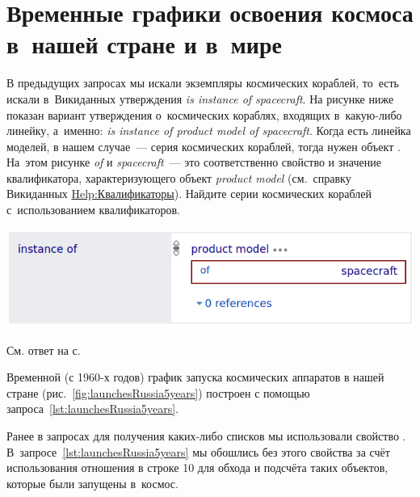 \section{Временные графики освоения космоса в~нашей стране и в~мире}


\begin{marginfigure}[0\baselineskip]
    \MarginQuestion 
    В предыдущих запросах мы искали экземпляры космических кораблей, 
    то~есть искали в~Викиданных утверждения \emph{is instance of spacecraft}. 
    На рисунке ниже показан вариант утверждения 
    о~космических кораблях, входящих в~какую-либо линейку, а~именно: 
    \emph{is instance of product model of spacecraft}. 
    Когда есть линейка моделей, в нашем случае~--- серия космических кораблей, 
    тогда нужен объект . 
    На~этом рисунке \emph{of} и \emph{spacecraft}~--- 
    это соответственно свойство и значение квалификатора, характеризующего объект \emph{product model} 
    (см.~справку Викиданных \href{https://www.wikidata.org/?curid=16567549}{Help:Квалификаторы}). 
    Найдите серии космических кораблей с~использованием квалификаторов. 

    \vspace{3pt}
	\includegraphics[width=0.8\linewidth]{graphics/chapter/spacecraft_space_station/is_product_model_red.png}

    См. ответ на с.~\pageref{answer:product_model}\\
    \label{question:product_model}
\end{marginfigure}


Временной (с 1960-х годов) 
график запуска космических аппаратов в нашей стране (рис.~\ref{fig:launchesRussia5years}) 
построен с помощью запроса~\ref{lst:launchesRussia5years}.%

Ранее в запросах для получения каких-либо списков мы использовали свойство . 
В~запросе~\ref{lst:launchesRussia5years} мы обошлись без этого свойства за счёт использования отношения 
 в строке 10 
для обхода и подсчёта таких объектов, которые были запущены в~космос.  

